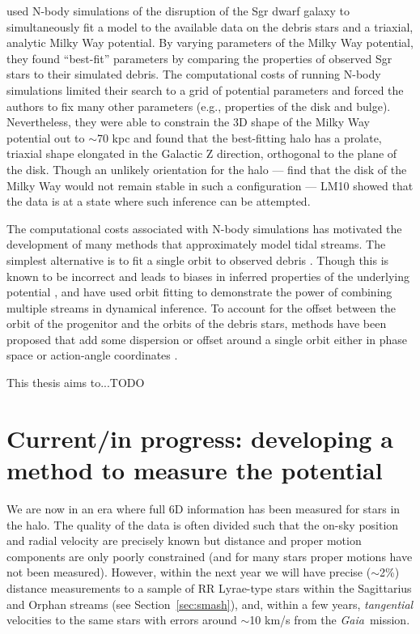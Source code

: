 \documentclass[letterpaper,12pt,preprint]{aastex}
\newcommand{\project}[1]{\textsl{#1}}
\newcommand{\gaia}{\project{Gaia}}
\begin{document}
\citet[][LM10]{law10} used N-body simulations of the disruption of the Sgr dwarf galaxy to simultaneously fit a model to the available data on the debris stars and a triaxial, analytic Milky Way potential. By varying parameters of the Milky Way potential, they found ``best-fit'' parameters by comparing the properties of observed Sgr stars to their simulated debris. The computational costs of running N-body simulations limited their search to a grid of potential parameters and forced the authors to fix many other parameters (e.g., properties of the disk and bulge). Nevertheless, they were able to constrain the 3D shape of the Milky Way potential out to $\sim$70 kpc and found that the best-fitting halo has a prolate, triaxial shape elongated in the Galactic Z direction, orthogonal to the plane of the disk. Though an unlikely orientation for the halo --- \cite{debattista13} find that the disk of the Milky Way would not remain stable in such a configuration --- LM10 showed that the data is at a state where such inference can be attempted. 

The computational costs associated with N-body simulations has motivated the development of many methods that approximately model tidal streams. The simplest alternative is to fit a single orbit to observed debris \citep[e.g.,][]{koposov10, deg13}. Though this is known to be incorrect and leads to biases in inferred properties of the underlying potential \citep[e.g.,][]{eyre11, lux13, sanders13a}, \cite{deg14} and \cite{lux13} have used orbit fitting to demonstrate the power of combining multiple streams in dynamical inference. To account for the offset between the orbit of the progenitor and the orbits of the debris stars, methods have been proposed that add some dispersion or offset around a single orbit either in phase space \citep[e.g.,][]{eyre09a, varghese11, kuepper12} or action-angle coordinates \citep{eyre11, sanders13b, bovy14, sanders14}. 

This thesis aims to...TODO

\section{Current/in progress: developing a method to measure the potential}
We are now in an era where full 6D information has been measured for stars in the halo. The quality of the data is often divided such that the on-sky position and radial velocity are precisely known but distance and proper motion components are only poorly constrained (and for many stars proper motions have not been measured). However, within the next year we will have precise ($\sim$2\%) distance measurements to a sample of RR Lyrae-type stars within the Sagittarius and Orphan streams (see Section~\ref{sec:smash}), and, within a few years, \emph{tangential} velocities to the same stars with errors around $\sim$10 km/s from the \gaia\ mission. 
\end{document}
